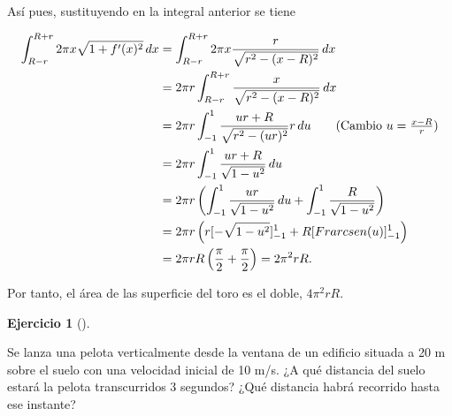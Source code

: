 \documentclass[
  spanish,
  a4paper,
]{scrreport}
\theoremstyle{definition}
\newtheorem{exercise}{Ejercicio}[chapter]
\theoremstyle{remark}
\begin{document}
\begin{tcolorbox}
Así pues, sustituyendo en la integral anterior se tiene

\begin{align*}
\int_{R-r}^{R+r} 2\pi x \sqrt{1+f'(x)^2}\,dx 
&= \int_{R-r}^{R+r} 2\pi x \frac{r}{\sqrt{r^2-(x-R)^2}}\,dx \\
&= 2\pi r \int_{R-r}^{R+r} \frac{x}{\sqrt{r^2-(x-R)^2}}\,dx \\
&= 2\pi r \int_{-1}^1 \frac{ur+R}{\sqrt{r^2-(ur)^2}}r\,du \tag{Cambio $u=\frac{x-R}{r}$}\\
&= 2\pi r \int_{-1}^1 \frac{ur+R}{\sqrt{1-u^2}}\,du \\
&= 2\pi r \left(\int_{-1}^1 \frac{ur}{\sqrt{1-u^2}}\,du + \int_{-1}^1 \frac{R}{\sqrt{1-u^2}}\right) \\
&= 2\pi r \left(r[-\sqrt{1-u^2}]_{-1}^1 + R[\operatorname{arcsen}(u)]_{-1}^1\right) \\
&= 2\pi r R\left(\frac{\pi}{2}+\frac{\pi}{2}\right)
= 2\pi^2 r R.
\end{align*}

Por tanto, el área de las superficie del toro es el doble,
\(4\pi^2 r R\).

\end{tcolorbox}

\begin{exercise}[]\protect\hypertarget{exr-cinematica-1}{}\label{exr-cinematica-1}

Se lanza una pelota verticalmente desde la ventana de un edificio
situada a 20 m sobre el suelo con una velocidad inicial de 10 m/s. ¿A
qué distancia del suelo estará la pelota transcurridos 3 segundos? ¿Qué
distancia habrá recorrido hasta ese instante?

\end{exercise}
\end{document}
